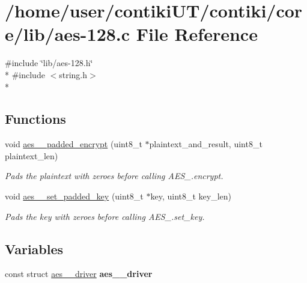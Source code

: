 \hypertarget{aes-128_8c}{}\section{/home/user/contiki\+U\+T/contiki/core/lib/aes-\/128.c File Reference}
\label{aes-128_8c}
{\ttfamily \#include \char`\"{}lib/aes-\/128.\+h\char`\"{}}\\*
{\ttfamily \#include $<$string.\+h$>$}\\*
\subsection*{Functions}
\begin{DoxyCompactItemize}
\item 
\hypertarget{aes-128_8c_aaf06f325766216e2c24ea4ce2d69bc38}{}void \hyperlink{aes-128_8c_aaf06f325766216e2c24ea4ce2d69bc38}{aes\+\_\+\_\+padded\+\_\+encrypt} (uint8\+\_\+t $\ast$plaintext\+\_\+and\+\_\+result, uint8\+\_\+t plaintext\+\_\+len)\label{aes-128_8c_aaf06f325766216e2c24ea4ce2d69bc38}

\begin{DoxyCompactList}\small\item\em Pads the plaintext with zeroes before calling A\+E\+S\+\_.\+encrypt. \end{DoxyCompactList}\item 
\hypertarget{aes-128_8c_af3d3a1d98476d18eb897330340517233}{}void \hyperlink{aes-128_8c_af3d3a1d98476d18eb897330340517233}{aes\+\_\+\_\+set\+\_\+padded\+\_\+key} (uint8\+\_\+t $\ast$key, uint8\+\_\+t key\+\_\+len)\label{aes-128_8c_af3d3a1d98476d18eb897330340517233}

\begin{DoxyCompactList}\small\item\em Pads the key with zeroes before calling A\+E\+S\+\_.\+set\+\_\+key. \end{DoxyCompactList}\end{DoxyCompactItemize}
\subsection*{Variables}
\begin{DoxyCompactItemize}
\item 
const struct \hyperlink{structaes__128__driver}{aes\+\_\+\_\+driver} {\bfseries aes\+\_\+\_\+driver}
\end{DoxyCompactItemize}


